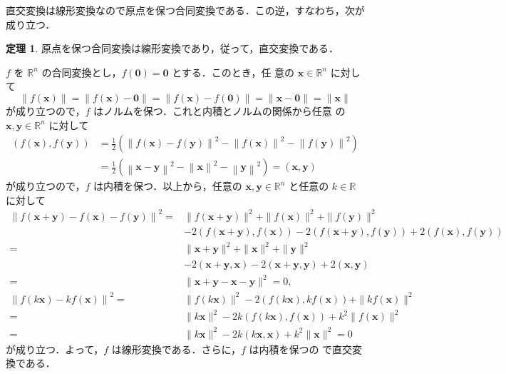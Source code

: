 \documentclass[11pt, uplatex, dvipdfmx, titlepage]{jsarticle}
\makeatletter
\renewenvironment{proof}[1][\proofname]{\par
  \pushQED{\qed}%
  \normalfont \topsep6\p@\@plus6\p@\relax
  \trivlist
  \item[\hskip\labelsep
         \bfseries
    {#1}]\ignorespaces
}{%
  \popQED\endtrivlist\@endpefalse
}
\theoremstyle{definition}
\newtheorem{theorem}{定理}[section]
\renewcommand{\proofname}{\textbf{証明}}
\makeatother
\begin{document}
直交変換は線形変換なので原点を保つ合同変換である．この逆，すなわち，次が成り立つ．

\begin{theorem}\label{thm:prev0}
  原点を保つ合同変換は線形変換であり，従って，直交変換である．
\end{theorem}

\begin{proof}
  $f$ を $\mathbb{R}^n$ の合同変換とし，$f(\bm{0}) = \bm{0}$ とする．このとき，任
  意の $\bm{x} \in \mathbb{R}^n$ に対して
  \[
    \|f(\bm{x})\| = \|f(\bm{x})-\bm{0}\| =\|f(\bm{x})-f(\bm{0})\|  = \|\bm{x}-\bm{0}\| = \| \bm{x}\|
  \]
  が成り立つので，$f$ はノルムを保つ．これと内積とノルムの関係から任意
  の $\bm{x}, \bm{y} \in \mathbb{R}^n$ に対して
  \begin{align*}
    \left(f(\bm{x}), f(\bm{y})\right)
    &= \frac{1}{2}\left(\left\|f(\bm{x})-f(\bm{y})\right\|^2-\left\|f(\bm{x})\right\|^2
      -\left\|f(\bm{y})\right\|^2\right)\\
    &=\frac{1}{2}\left(\left\|\bm{x}-\bm{y}\right\|^2-\left\|\bm{x}\right\|^2-\left\|\bm{y}\right\|^2\right)
      = \left(\bm{x}, \bm{y}\right)
  \end{align*}
  が成り立つので，$f$ は内積を保つ．以上から，任意の $\bm{x}, \bm{y}
  \in \mathbb{R}^n$ と任意の $k \in \mathbb{R}$ に対して
  \begin{align*}
    \left\|f(\bm{x}+\bm{y}) -  f(\bm{x}) - f(\bm{y}) \right\|^2
    =& \|f(\bm{x}+\bm{y})\|^2+\|f(\bm{x})\|^2+\|f(\bm{y})\|^2\\
     &- 2\left(f(\bm{x}+\bm{y}), f(\bm{x})\right)
       -2\left( f(\bm{x}+\bm{y}), f(\bm{y})\right)+2\left(f(\bm{x}), f(\bm{y})\right)\\
    =& \| \bm{x} + \bm{y}\|^2 + \|\bm{x}\|^2+\|\bm{y}\|^2\\
     &-2\left(\bm{x}+\bm{y},\bm{x}\right)-2\left(\bm{x}+\bm{y}, \bm{y}\right)+2\left(\bm{x},\bm{y}\right)\\
    =& \|\bm{x}+\bm{y} - \bm{x}-\bm{y}\|^2=0,\\
    \left\| f(k\bm{x}) - k f(\bm{x})\right\|^2  
    =& \|f(k\bm{x})\|^2-2\left( f(k\bm{x}), kf(\bm{x}) \right) + \|kf(\bm{x})\|^2\\
    =& \|k\bm{x}\|^2 - 2k\left(f(k\bm{x}), f(\bm{x})\right) + k^2\|f(\bm{x})\|^2\\
    =& \|k\bm{x}\|^2-2k\left( k\bm{x}, \bm{x}\right) + k^2 \|\bm{x}\|^2= 0
  \end{align*}
  が成り立つ．よって，$f$ は線形変換である．さらに，$f$ は内積を保つの
  で直交変換である．
\end{proof}
\end{document}
